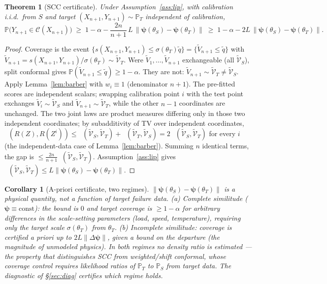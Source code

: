\documentclass[11pt]{article}
\newtheorem{theorem}{Theorem}
\newtheorem{corollary}{Corollary}
\theoremstyle{definition}
\theoremstyle{remark}
\DeclareMathOperator{\dtv}{d_{\mathrm{TV}}}
\newcommand{\lawt}[1]{\tilde{\mathcal{V}}_{#1}}
\begin{document}
\begin{theorem}[SCC certificate]\label{thm:scc}
Under Assumption~\ref{ass:lip}, with calibration i.i.d.\ from $S$ and target
$(X_{n+1},Y_{n+1})\sim\mathbb P_T$ independent of calibration,
\[
\mathbb P\big(Y_{n+1}\in\mathcal C(X_{n+1})\big)\;\ge\;
1-\alpha-\frac{2n}{n+1}\,L\,\big\lVert\boldsymbol\psi(\theta_S)-\boldsymbol\psi(\theta_T)\big\rVert
\;\ge\;1-\alpha-2L\,\big\lVert\boldsymbol\psi(\theta_S)-\boldsymbol\psi(\theta_T)\big\rVert .
\]
\end{theorem}
\begin{proof}
Coverage is the event $\{s(X_{n+1},Y_{n+1})\le\sigma(\theta_T)\tilde q\}
=\{\tilde V_{n+1}\le\tilde q\}$ with $\tilde V_{n+1}=s(X_{n+1},Y_{n+1})/\sigma(\theta_T)
\sim\lawt T$. Were $\tilde V_1,\dots,\tilde V_{n+1}$ exchangeable (all $\lawt S$),
split conformal gives $\mathbb P(\tilde V_{n+1}\le\tilde q)\ge1-\alpha$. They are not:
$\tilde V_{n+1}\sim\lawt T\neq\lawt S$. Apply Lemma~\ref{lem:barber} with $w_i\equiv1$
(denominator $n+1$). The pre-fitted scores are independent scalars; swapping
calibration point $i$ with the test point exchanges $\tilde V_i\sim\lawt S$ and
$\tilde V_{n+1}\sim\lawt T$, while the other $n-1$ coordinates are unchanged. The two
joint laws are product measures differing only in those two independent coordinates;
by subadditivity of TV over independent coordinates,
$\dtv(R(Z),R(Z^i))\le\dtv(\lawt S,\lawt T)+\dtv(\lawt T,\lawt S)=2\,\dtv(\lawt S,\lawt T)$
for every $i$ (the independent-data case of Lemma~\ref{lem:barber}). Summing $n$
identical terms, the gap is $\le \tfrac{2n}{n+1}\dtv(\lawt S,\lawt T)$.
Assumption~\ref{ass:lip} gives
$\dtv(\lawt S,\lawt T)\le L\lVert\boldsymbol\psi(\theta_S)-\boldsymbol\psi(\theta_T)\rVert$.
\end{proof}

\begin{corollary}[A-priori certificate, two regimes]\label{cor:apriori}
$\lVert\boldsymbol\psi(\theta_S)-\boldsymbol\psi(\theta_T)\rVert$ is a physical quantity,
not a function of target failure data.
\emph{(a) Complete similitude} ($\boldsymbol\psi\equiv\text{const}$): the bound is
$0$ and target coverage is $\ge1-\alpha$ \emph{for arbitrary differences in the
scale-setting parameters} (load, speed, temperature), requiring only the target scale
$\sigma(\theta_T)$ from $\theta_T$. \emph{(b) Incomplete similitude}: coverage is
certified a priori up to $2L\lVert\Delta\boldsymbol\psi\rVert$, given a bound on the
departure (the magnitude of unmodeled physics). In both regimes no density ratio is
estimated --- the property that distinguishes SCC from weighted/shift conformal, whose
coverage control requires likelihood ratios of $\mathbb P_T$ to $\mathbb P_S$ from
target data. The diagnostic of \S\ref{sec:diag} certifies which regime holds.
\end{corollary}
\end{document}
